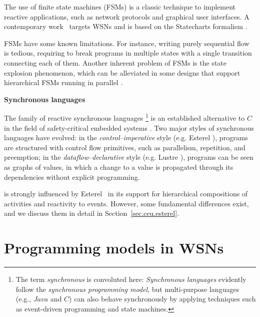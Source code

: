 The use of finite state machines (FSMs) is a classic technique to implement
reactive applications, such as network protocols and graphical user interfaces.
A contemporary work~\cite{wsn.osm} targets WSNs and is based on the Statecharts 
formalism \cite{statecharts.visual}.

FSMs have some known limitations.
For instance, writing purely sequential flow is tedious, requiring to break 
programs in multiple states with a single transition connecting each of them.  
Another inherent problem of FSMs is the state explosion phenomenon, which can 
be alleviated in some designs that support hierarchical FSMs running in 
parallel \cite{wsn.osm}.



\textbf{Synchronous languages}

The family of reactive synchronous languages%
\footnote{
The term \emph{synchronous} is convoluted here:
\emph{Synchronous languages} evidently follow the \emph{synchronous programming 
model}, but multi-purpose languages (e.g., $Java$ and $C$) can also behave 
synchronously by applying techniques such as event-driven programming and state 
machines.
}
is an established alternative to $C$ in the field of safety-critical embedded 
systems \cite{rp.twelve}.
%
Two major styles of synchronous languages have evolved:
in the \emph{control}--\emph{imperative} style (e.g. Esterel 
\cite{esterel.design}), programs are structured with control flow primitives, 
such as parallelism, repetition, and preemption;
in the \emph{dataflow}--\emph{declarative} style (e.g. Lustre 
\cite{lustre.ieee91}), programs can be seen as graphs of values, in which a 
change to a value is propagated through its dependencies without explicit 
programming.

\CEU is strongly influenced by Esterel~\cite{esterel.ieee91} in its support for 
hierarchical compositions of activities and reactivity to events.
%
However, some fundamental differences exist, and we discuss them in detail in
Section~\ref{sec.ceu.esterel}.

\section{Programming models in WSNs}
\label{sec.ceu.overview}

